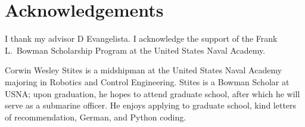 \documentclass[twocolumn,10pt]{IEEEtran}
\newcommand{\myroot}{.}
\begin{document}
\section*{Acknowledgements}
I thank my advisor D Evangelista. I acknowledge the support of the Frank L.~Bowman Scholarship Program at the United States Naval Academy. 



\begin{IEEEbiography}{Corwin Wesley Stites} is a midshipman at the United States Naval Academy majoring in Robotics and Control Engineering. Stites is a Bowman Scholar at USNA; upon graduation, he hopes to attend graduate school, after which he will serve as a submarine officer. He enjoys applying to graduate school, kind letters of recommendation, German, and Python coding. 
\end{IEEEbiography}
\end{document}
